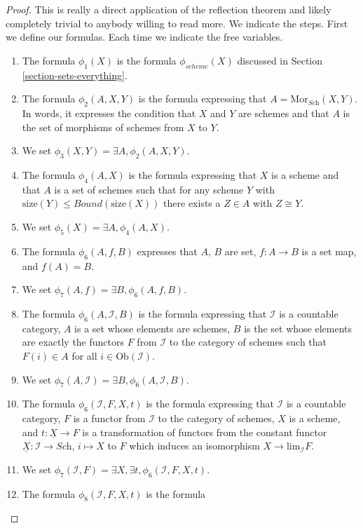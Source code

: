 \begin{proof}
This is really a direct application of the reflection theorem and
likely completely trivial to anybody willing to read more.
We indicate the steps. First we define our formulas. Each
time we indicate the free variables.
\begin{enumerate}
\item The formula $\phi_1(X)$ is the formula $\phi_{scheme}(X)$
discussed in Section \ref{section-sets-everything}.
\item The formula $\phi_2(A, X, Y)$ is the formula
expressing that $A = \text{Mor}_{\textit{Sch}}(X, Y)$.
In words, it expresses the condition that $X$ and $Y$ are schemes
and that $A$ is the set of morphisms of schemes from $X$ to $Y$.
\item We set $\phi_3(X, Y) = \exists A, \phi_2(A, X, Y)$.
\item The formula $\phi_4(A, X)$ is the formula expressing
that $X$ is a scheme and that $A$ is a set of schemes such
that for any scheme $Y$ with
$\text{size}(Y) \leq Bound(\text{size}(X))$ there
exists a $Z \in A$ with $Z \cong Y$.
\item We set $\phi_5(X) = \exists A, \phi_4(A, X)$.
\item The formula $\phi_6(A, f, B)$ expresses that
$A$, $B$ are set, $f : A \to B$ is a set map, and
$f(A) = B$.
\item We set $\phi_7(A, f) = \exists B, \phi_6(A, f, B)$.
\item The formula $\phi_6(A, \mathcal{I}, B)$
is the formula expressing that $\mathcal{I}$
is a countable category, $A$ is a set whose elements are schemes,
$B$ is the set whose elements are exactly the functors
$F$ from $\mathcal{I}$ to the category of schemes
such that $F(i) \in A$ for all $i \in \text{Ob}(\mathcal{I})$.
\item We set $\phi_7(A, \mathcal{I}) =
\exists B, \phi_6(A, \mathcal{I}, B)$.
\item The formula $\phi_6(\mathcal{I}, F, X, t)$ is the formula
expressing that $\mathcal{I}$ is a countable category, $F$ is 
a functor from $\mathcal{I}$ to the category of schemes,
$X$ is a scheme, and $t : \underline{X} \to F$
is a transformation of functors from the constant
functor $\underline{X} : \mathcal{I} \to \textit{Sch}$,
$i \mapsto X$ to $F$ which induces an isomorphism
$X \to \text{lim}_{\mathcal{I}} F$.
\item We set
$\phi_7(\mathcal{I}, F) = \exists X, \exists t, \phi_6(\mathcal{I}, F, X, t)$.
\item The formula $\phi_8(\mathcal{I}, F, X, t)$ is the formula

\end{enumerate}
\end{proof}
